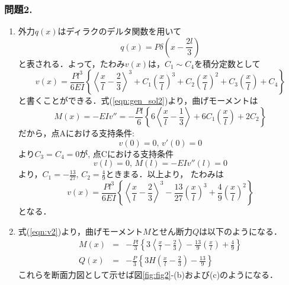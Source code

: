 \documentclass[10pt,a4j]{jarticle}
\begin{document}
\subsubsection*{問題2. }
\begin{enumerate}
\item
外力$q(x)$はディラクのデルタ関数を用いて
\begin{equation}
	q(x)=P\delta \left(x-\frac{2l}{3} \right)
	\label{eqn:qx_dlt}
\end{equation}
と表される．よって，たわみ$v(x)$は，$C_1\sim C_4$を積分定数として
\begin{equation}
	v(x)=\frac{Pl^3}{6EI}\left\{
			\left< \frac{x}{l} -\frac{2}{3}\right>^3
			+
			C_1\left(\frac{x}{l}\right)^3
			+
			C_2\left(\frac{x}{l}\right)^2
			+
			C_3\left(\frac{x}{l}\right)
			+
			C_4
		\right\}
		\label{eqn:gen_sol2}
\end{equation}
	と書くことができる．式(\ref{eqn:gen_sol2})より，曲げモーメントは
\begin{equation}
	M(x)=-EIv''=-\frac{Pl}{6}\left\{
			6\left< \frac{x}{l} -\frac{1}{3}\right>
			+
			6C_1\left(\frac{x}{l}\right)
			+
			2C_2
		\right\}
\end{equation}
だから，点Aにおける支持条件:
\begin{equation}
	v(0)=0,\, v'(0)=0
\end{equation}
より$C_3=C_4=0$が, 点Cにおける支持条件
\begin{equation}
	v(l)=0,\, M(l)=-EIv''(l)=0
\end{equation}
より，$C_1=-\frac{13}{27}, \, C_2=\frac{4}{9}$ときまる．以上より，
たわみは
\begin{equation}
	v(x)=\frac{Pl^3}{6EI}\left\{
			\left< \frac{x}{l} -\frac{2}{3}\right>^3
			-
			\frac{13}{27}\left(\frac{x}{l}\right)^3
			+
			\frac{4}{9}\left( \frac{x}{l} \right)^2
			\right\}
	\label{eqn:v2}
\end{equation}
となる．
\item
式(\ref{eqn:v2})より，曲げモーメント$M$とせん断力$Q$は以下のようになる．
\begin{eqnarray}
	M(x) &=& 
		-\frac{Pl}{3}
			\left\{
				3\left< \frac{x}{l} - \frac{2}{3}\right> 
				-\frac{13}{9}\left(\frac{x}{l}\right)
				+\frac{4}{9}
			\right\}
	\label{eqn:M2}
	\\
	Q(x) &=&
		-\frac{P}{3}
		\left\{
				3H\left(\frac{x}{l} -\frac{2}{3}\right)
				-
				\frac{13}{9}
		\right\}
	\label{eqn:Q2}
\end{eqnarray}
これらを断面力図として示せば図\ref{fig:fig2}-(b)および(c)のようになる．

\end{enumerate}
\end{document}
